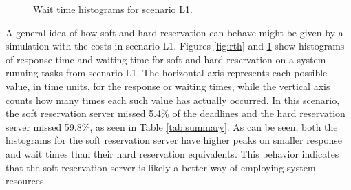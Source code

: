 \documentclass[times, 10pt,twocolumn]{article}
\begin{document}
\begin{figure}[t]
  \centering
  \caption{Wait time histograms for scenario L1.}
  \label{fig:dth}
\end{figure}

A general idea of how soft and hard reservation can behave might be
given by a simulation with the costs in scenario L1. Figures
\ref{fig:rth} and \ref{fig:dth} show histograms of response time and
waiting time for soft and hard reservation on a system running tasks
from scenario L1. The horizontal axis represents each possible value,
in time units, for the response or waiting times, while the vertical
axis counts how many times each such value has actually occurred. In
this scenario, the soft reservation server missed 5.4\% of the
deadlines and the hard reservation server missed 59.8\%, as seen in
Table \ref{tab:summary}. As can be seen, both the histograms for the
soft reservation server have higher peaks on smaller response and wait
times than their hard reservation equivalents. This behavior indicates
that the soft reservation server is likely a better way of employing
system resources.
\end{document}
